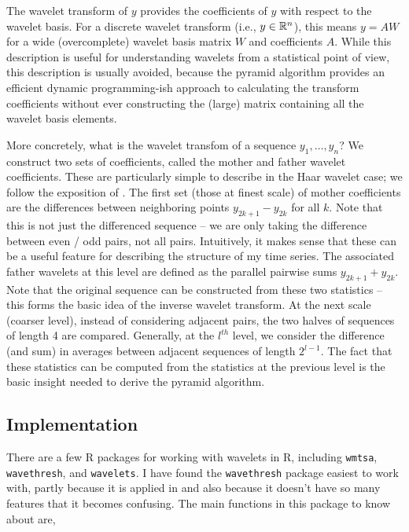 \documentclass{article}
\begin{document}
The wavelet transform of $y$ provides the coefficients of $y$ with respect to
the wavelet basis. For a discrete wavelet transform (i.e., $y \in \mathbb{R}^{n}$),
this means $y = AW$ for a wide (overcomplete) wavelet basis matrix $W$ and
coefficients $A$. While this description is useful for understanding wavelets
from a statistical point of view, this description is usually avoided, because
the pyramid algorithm provides an efficient dynamic programming-ish approach to
calculating the transform coefficients without ever constructing the (large)
matrix containing all the wavelet basis elements.

More concretely, what is the wavelet transfom of a sequence $y_{1}, \dots,
y_{n}$? We construct two sets of coefficients, called the mother and father
wavelet coefficients. These are particularly simple to describe in the Haar
wavelet case; we follow the exposition of \citep{nason2010wavelet}. The first
set (those at finest scale) of mother coefficients are the differences between
neighboring points $y_{2k +1} - y_{2k}$ for all $k$. Note that this is not just
the differenced sequence -- we are only taking the difference between even / odd
pairs, not all pairs. Intuitively, it makes sense that these can be a useful
feature for describing the structure of my time series. The associated father
wavelets at this level are defined as the parallel pairwise sums $y_{2k + 1} +
y_{2k}$. Note that the original sequence can be constructed from these two
statistics -- this forms the basic idea of the inverse wavelet transform. At the
next scale (coarser level), instead of considering adjacent pairs, the two
halves of sequences of length 4 are compared. Generally, at the $l^{th}$ level,
we consider the difference (and sum) in averages between adjacent sequences of
length $2^{l - 1}$. The fact that these statistics can be computed from the
statistics at the previous level is the basic insight needed to derive the
pyramid algorithm.

\subsection{Implementation}

There are a few R packages for working with wavelets in R, including
\texttt{wmtsa}, \texttt{wavethresh}, and \texttt{wavelets}. I have found the
\texttt{wavethresh} package easiest to work with, partly because it is applied
in \citep{nason2010wavelet} and also because it doesn't have so many features
that it becomes confusing. The main functions in this package to know about are,
\end{document}
